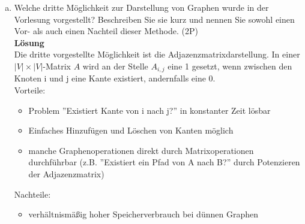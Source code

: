 \documentclass{scrartcl}
\begin{document}
\begin{enumerate}[(1)]
\begin{enumerate}[(a)]
	\item Welche dritte Möglichkeit zur Darstellung von Graphen wurde in der Vorlesung vorgestellt? Beschreiben Sie sie kurz und nennen Sie sowohl einen Vor- als auch einen Nachteil dieser Methode. (2P)\\
	\textbf{Lösung}\\
	Die dritte vorgestellte Möglichkeit ist die Adjazenzmatrixdarstellung. In einer $|V| \times |V|$-Matrix $A$ wird an der Stelle $A_{i,j}$ eine 1 gesetzt, wenn zwischen den Knoten i und j eine Kante existiert, andernfalls eine 0.\\
	Vorteile:
	\begin{itemize}
		\item Problem ''Existiert Kante von i nach j?'' in konstanter Zeit lösbar
		\item Einfaches Hinzufügen und Löschen von Kanten möglich
		\item manche Graphenoperationen direkt durch Matrixoperationen durchführbar (z.B. ''Existiert ein Pfad von A nach B?'' durch Potenzieren der Adjazenzmatrix)
	\end{itemize}
	Nachteile:
	\begin{itemize}
		\item verhältnismäßig hoher Speicherverbrauch bei dünnen Graphen
	\end{itemize}
\end{enumerate} 


\end{enumerate}
\end{document}
